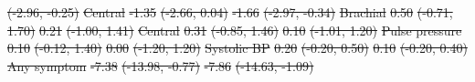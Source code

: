 \documentclass[
  letterpaper,
  DIV=11,
  numbers=noendperiod]{scrartcl}
\makeatletter
\renewenvironment{table}%
   {\renewcommand\familydefault\sfdefault
    \@float{table}}
   {\end@float}
\providecommand{\DIFdeltex}[1]{{\protect\color{red}\sout{#1}}}                      %
\providecommand{\DIFdelFL}[1]{\DIFdel{#1}} %
\providecommand{\DIFdel}[1]{\texorpdfstring{\DIFdeltex{#1}}{}} %
\makeatother
\begin{document}
\begin{table}
\DIFdelFL{(-2.96, -0.25)}%
\DIFdelFL{Central }%
\DIFdelFL{-1.35 }%
\DIFdelFL{(-2.66, 0.04) }%
\DIFdelFL{-1.66 }%
\DIFdelFL{(-2.97, -0.34)}%
\DIFdelFL{\hspace{1em} }%
\DIFdelFL{Brachial }%
\DIFdelFL{0.50 }%
\DIFdelFL{(-0.71, 1.70) }%
\DIFdelFL{0.21 }%
\DIFdelFL{(-1.00, 1.41)}%
\DIFdelFL{Central }%
\DIFdelFL{0.31 }%
\DIFdelFL{(-0.85, 1.46) }%
\DIFdelFL{0.10 }%
\DIFdelFL{(-1.01, 1.20)}%
\DIFdelFL{\hspace{1em} }%
\DIFdelFL{Pulse pressure }%
\DIFdelFL{0.10 }%
\DIFdelFL{(-0.12, 1.40) }%
\DIFdelFL{0.00 }%
\DIFdelFL{(-1.20, 1.20)}%
\DIFdelFL{Systolic BP }%
\DIFdelFL{0.20 }%
\DIFdelFL{(-0.20, 0.50) }%
\DIFdelFL{0.10 }%
\DIFdelFL{(-0.20, 0.40)}%
\DIFdelFL{\hspace{1em} }%
\DIFdelFL{Any symptom }%
\DIFdelFL{-7.38 }%
\DIFdelFL{(-13.98, -0.77) }%
\DIFdelFL{-7.86 }%
\DIFdelFL{(-14.63, -1.09)}%

\end{table}
\end{document}
